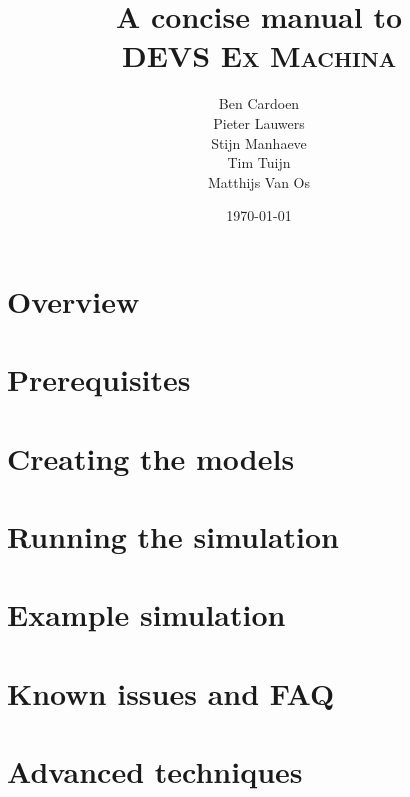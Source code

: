 \documentclass[10pt,a4paper]{report}
\title{A concise manual to\\\textsc{DEVS Ex Machina}}
\author{Ben Cardoen\\Pieter Lauwers\\Stijn Manhaeve\\Tim Tuijn\\Matthijs Van Os}
\date{\today}
\begin{document}
\maketitle
\tableofcontents{}

\chapter{Overview}


\chapter{Prerequisites}

\chapter{Creating the models}


\chapter{Running the simulation}


\appendix
\chapter{Example simulation}

\chapter{Known issues and FAQ}

\chapter{Advanced techniques}
\end{document}
